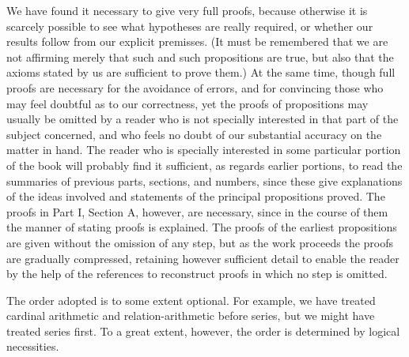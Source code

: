\documentclass[10pt]{article}
\begin{document}
We have found it necessary to give very full proofs, because otherwise it is scarcely possible to see what hypotheses are really required, or whether our results follow from our explicit premisses. (It must be remembered that we are not affirming merely that such and such propositions are true, but also that the axioms stated by us are sufficient to prove them.) At the same time, though full proofs are necessary for the avoidance of errors, and for convincing those who may feel doubtful as to our correctness, yet the proofs of propositions may usually be omitted by a reader who is not specially interested in that part of the subject concerned, and who feels no doubt of our substantial accuracy on the matter in hand. The reader who is specially interested in some particular portion of the book will probably find it sufficient, as regards earlier portions, to read the summaries of previous parts, sections, and numbers, since these give explanations of the ideas involved and statements of the principal propositions proved. The proofs in Part I, Section A, however, are necessary, since in the course of them the manner of stating proofs is explained. The proofs of the earliest propositions are given without the omission of any step, but as the work proceeds the proofs are gradually compressed, retaining however sufficient detail to enable the reader by the help of the references to reconstruct proofs in which no step is omitted.

The order adopted is to some extent optional. For example, we have treated cardinal arithmetic and relation-arithmetic before series, but we might have treated series first. To a great extent, however, the order is determined by logical necessities.
\end{document}
